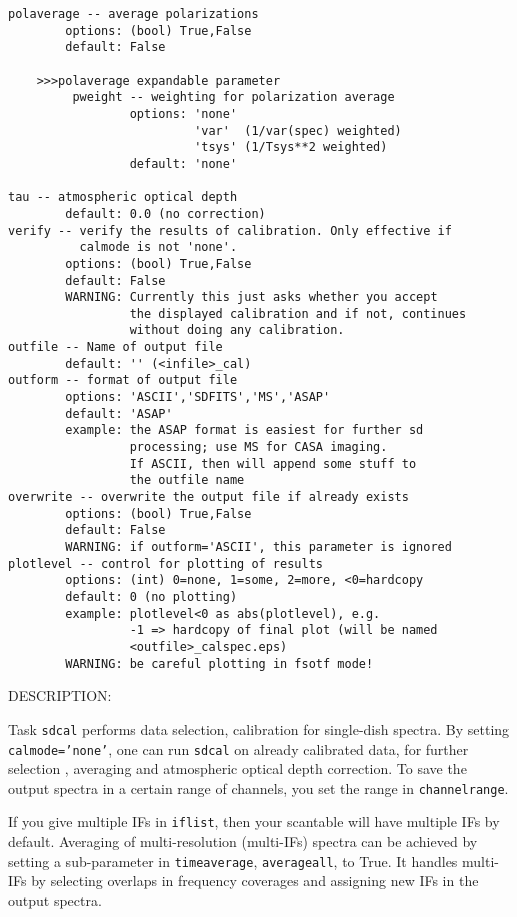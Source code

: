 \begin{verbatim}
polaverage -- average polarizations
        options: (bool) True,False
        default: False

    >>>polaverage expandable parameter
         pweight -- weighting for polarization average
                 options: 'none'
                          'var'  (1/var(spec) weighted)
                          'tsys' (1/Tsys**2 weighted)
                 default: 'none'

tau -- atmospheric optical depth
        default: 0.0 (no correction)
verify -- verify the results of calibration. Only effective if 
          calmode is not 'none'.
        options: (bool) True,False
        default: False
        WARNING: Currently this just asks whether you accept
                 the displayed calibration and if not, continues
                 without doing any calibration. 
outfile -- Name of output file
        default: '' (<infile>_cal)
outform -- format of output file
        options: 'ASCII','SDFITS','MS','ASAP'
        default: 'ASAP'
        example: the ASAP format is easiest for further sd
                 processing; use MS for CASA imaging.
                 If ASCII, then will append some stuff to
                 the outfile name
overwrite -- overwrite the output file if already exists
        options: (bool) True,False
        default: False
        WARNING: if outform='ASCII', this parameter is ignored
plotlevel -- control for plotting of results
        options: (int) 0=none, 1=some, 2=more, <0=hardcopy
        default: 0 (no plotting)
        example: plotlevel<0 as abs(plotlevel), e.g.
                 -1 => hardcopy of final plot (will be named
                 <outfile>_calspec.eps)
        WARNING: be careful plotting in fsotf mode!
\end{verbatim}

DESCRIPTION:

Task {\tt sdcal} performs data selection, calibration for single-dish
spectra.  By setting {\tt calmode='none'}, one can run {\tt sdcal} on already 
calibrated data, for further selection , averaging and atmospheric 
optical depth correction. To save the output spectra in a certain range of 
channels, you set the range in {\tt channelrange}.

If you give multiple IFs in {\tt iflist}, then your scantable will have
multiple IFs by default. Averaging of multi-resolution (multi-IFs)
spectra can be achieved by setting a sub-parameter in {\tt timeaverage}, 
{\tt averageall}, to True. It handles multi-IFs by selecting overlaps in 
frequency coverages and assigning new IFs in the output spectra.

